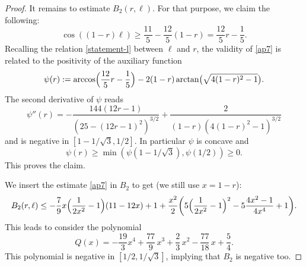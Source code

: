 \documentclass[11pt]{article}
\numberwithin{equation}{section}
\theoremstyle{plain}
\theoremstyle{definition}
\begin{document}
\begin{proof}
It remains to estimate $B_2(r,\ell)$. For that purpose, we claim the following:
\begin{equation}\label{ap7}
\cos((1-r)\ell) \geq \frac{11}{5} - \frac{12}{5}(1-r) = \frac{12}{5} r - \frac{1}{5}.
\end{equation}
Recalling the relation \eqref{statement-l} between $\ell$ and $r$, the validity of \eqref{ap7} is related to the positivity of the auxiliary function\vspace*{-2pt}
\[
\psi(r):=\arccos\Bigl(\frac{12}{5} r - \frac{1}{5}\Bigr)-
2(1-r)\arctan\bigl(\sqrt{4(1-r)^2-1}\bigr).
\]
The second derivative of $\psi$ reads\vspace*{-2pt}
\[
\psi''(r)=-\frac{144(12 r-1)}{\left( 25-(12 r -1)^2\right)^{3/2}} + \frac{2}{(1-r)(4(1-r)^2-1)^{3/2}}
\]
and is negative in $[1-1/\sqrt{3},1/2]$. In particular $\psi$ is concave and\vspace*{-3pt}
\[
\psi(r)\geq \min (\psi(1-1/\sqrt{3}),\psi(1/2))\geq 0.
\]
This proves the claim.

We insert the estimate \eqref{ap7} in $B_2$ to get (we still use $x=1-r$):
\[
B_2(r,\ell) \leq -\frac{7}{9}x\Bigl(\frac{1}{2x^2}-1\Bigr)(11-12x)+1+\frac{x^2}{2}
\biggl( 5\Bigl(\frac{1}{2x^2}-1\Bigr)^2-5\frac{4x^2-1}{4x^4} +1\biggr).
\]
This leads to consider the polynomial
\[
Q(x)=-\frac{19}{3}x^4+\frac{77}{9}\,x^3+\frac{2}{3}\,x^2-\frac{77}{18}\,x+\frac{5}{4}.
\]
This polynomial is negative in $[1/2,1/\sqrt{3}]$, implying that $B_2$ is negative too.
\end{proof}
\end{document}
